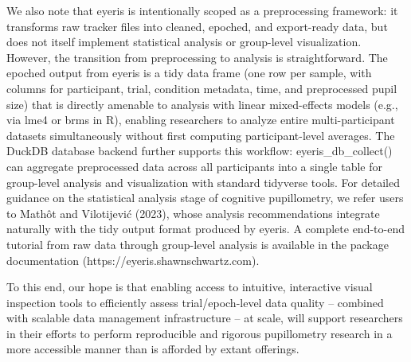 We also note that eyeris is intentionally scoped as a preprocessing framework: it transforms raw tracker files into cleaned, epoched, and export-ready data, but does not itself implement statistical analysis or group-level visualization. However, the transition from preprocessing to analysis is straightforward. The epoched output from eyeris is a tidy data frame (one row per sample, with columns for participant, trial, condition metadata, time, and preprocessed pupil size) that is directly amenable to analysis with linear mixed-effects models (e.g., via lme4 or brms in R), enabling researchers to analyze entire multi-participant datasets simultaneously without first computing participant-level averages. The DuckDB database backend further supports this workflow: eyeris\_db\_collect() can aggregate preprocessed data across all participants into a single table for group-level analysis and visualization with standard tidyverse tools. For detailed guidance on the statistical analysis stage of cognitive pupillometry, we refer users to Mathôt and Vilotijević (2023), whose analysis recommendations integrate naturally with the tidy output format produced by eyeris. A complete end-to-end tutorial from raw data through group-level analysis is available in the package documentation (https://eyeris.shawnschwartz.com).

To this end, our hope is that enabling access to intuitive, interactive visual inspection tools to efficiently assess trial/epoch-level data quality – combined with scalable data management infrastructure – at scale, will support researchers in their efforts to perform reproducible and rigorous pupillometry research in a more accessible manner than is afforded by extant offerings.